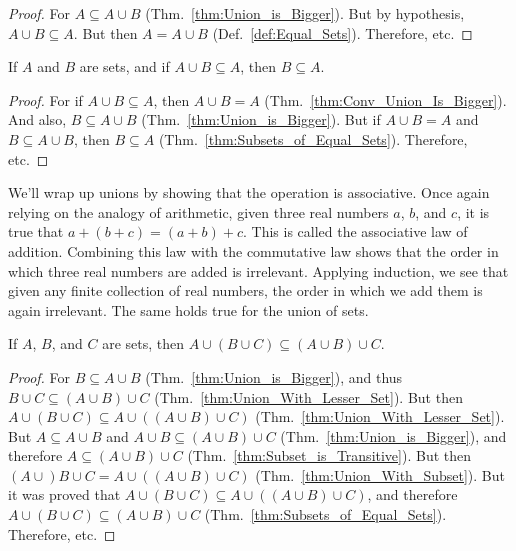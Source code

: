 \documentclass[crop=false,class=book,oneside]{standalone}
\begin{document}
            \begin{proof}
                For $A\subseteq{A}\cup{B}$
                (Thm.~\ref{thm:Union_is_Bigger}). But by
                hypothesis, $A\cup{B}\subseteq{A}$. But then
                $A=A\cup{B}$ (Def.~\ref{def:Equal_Sets}).
                Therefore, etc.
            \end{proof}
            \newpage
            \begin{theorem}
                \label{thm:Union_is_Equal}%
                If $A$ and $B$ are sets, and if
                $A\cup{B}\subseteq{A}$, then $B\subseteq{A}$.
            \end{theorem}
            \begin{proof}
                For if $A\cup{B}\subseteq{A}$, then
                $A\cup{B}=A$
                (Thm.~\ref{thm:Conv_Union_Is_Bigger}). And also,
                $B\subseteq{A}\cup{B}$
                (Thm.~\ref{thm:Union_is_Bigger}). But if
                $A\cup{B}=A$ and $B\subseteq{A}\cup{B}$, then
                $B\subseteq{A}$
                (Thm.~\ref{thm:Subsets_of_Equal_Sets}).
                Therefore, etc.
            \end{proof}
            We'll wrap up unions by showing that the operation
            is associative. Once again relying on the analogy
            of arithmetic, given three real numbers $a$, $b$,
            and $c$, it is true that $a+(b+c)=(a+b)+c$. This
            is called the associative law of addition. Combining
            this law with the commutative law shows that the
            order in which three real numbers are added is
            irrelevant. Applying induction, we see that given
            any finite collection of real numbers, the order in
            which we add them is again irrelevant. The same holds
            true for the union of sets.
            \begin{theorem}
                \label{thm:First_Assoc_Law_Union}%
                If $A$, $B$, and $C$ are sets, then
                $A\cup(B\cup{C})\subseteq(A\cup{B})\cup{C}$.
            \end{theorem}
            \begin{proof}
                For $B\subseteq{A}\cup{B}$
                (Thm.~\ref{thm:Union_is_Bigger}), and thus
                $B\cup{C}\subseteq(A\cup{B})\cup{C}$
                (Thm.~\ref{thm:Union_With_Lesser_Set}). But then
                $A\cup(B\cup{C})\subseteq{A}%
                 \cup((A\cup{B})\cup{C})$
                (Thm.~\ref{thm:Union_With_Lesser_Set}).
                But $A\subseteq{A}\cup{B}$ and
                $A\cup{B}\subseteq(A\cup{B})\cup{C}$
                (Thm.~\ref{thm:Union_is_Bigger}), and therefore
                $A\subseteq(A\cup{B})\cup{C}$
                (Thm.~\ref{thm:Subset_is_Transitive}). But then
                $(A\cup)B\cup{C}={A}\cup((A\cup{B})\cup{C})$
                (Thm.~\ref{thm:Union_With_Subset}). But it was
                proved that
                $A\cup(B\cup{C})\subseteq{A}%
                 \cup((A\cup{B})\cup{C})$, and therefore
                $A\cup(B\cup{C})\subseteq(A\cup{B})\cup{C}$
                (Thm.~\ref{thm:Subsets_of_Equal_Sets}).
                Therefore, etc.
            \end{proof}
\end{document}
